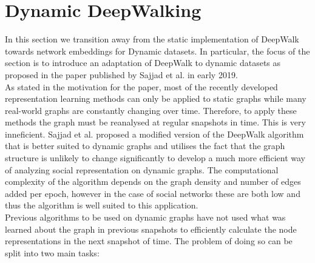 \documentclass[a4paper]{article}
\begin{document}
\section{Dynamic DeepWalking}
In this section we transition away from the static implementation of DeepWalk
towards network embeddings for Dynamic datasets. In particular, the focus of the
section is to introduce an adaptation of DeepWalk to dynamic datasets as
proposed in the paper published by Sajjad et al.\cite{sajjad2019} in early
2019.\\
As stated in the motivation for the paper, most of the recently developed
representation learning methods can only be applied to static graphs while many
real-world graphs are constantly changing over time. Therefore, to apply these
methods the graph must be reanalysed at regular snapshots in time. This is very
inneficient. Sajjad et al. proposed a modified version of the DeepWalk
algorithm that is better suited to dynamic graphs and utilises the fact that the
graph structure is unlikely to change significantly to develop a much more
efficient way of analyzing social representation on dynamic graphs.
The computational complexity of the algorithm depends on the graph density and
number of edges added per epoch, however in the case of social networks these
are both low and thus the algorithm is well suited to this application.\\
Previous algorithms to be used on dynamic graphs have not used what
was learned about the graph in previous snapshots to efficiently calculate the
node representations in the next snapshot of time. The problem of doing so can
be split into two main tasks:
\end{document}
